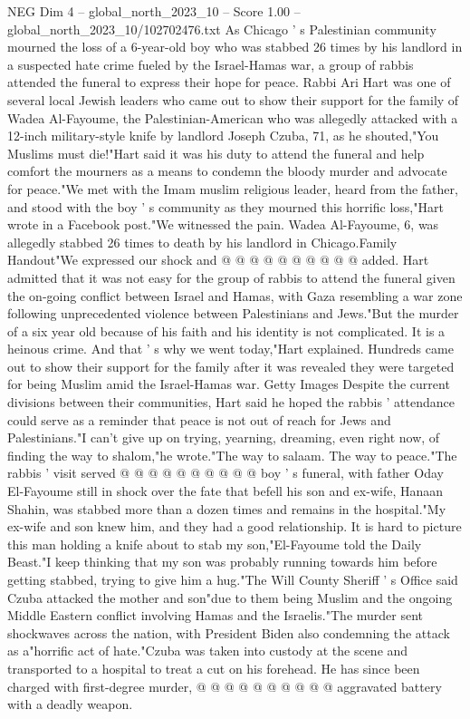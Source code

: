 \begin{textsample}{NEG Dim 4 – global\_north\_2023\_10 – Score 1.00 – global\_north\_2023\_10/102702476.txt}  \label{ex:f4_neg_017}
As Chicago ' s Palestinian community mourned the loss of a 6-year-old boy who was stabbed 26 times by his landlord in a suspected hate crime fueled by the Israel-Hamas war, a group of rabbis attended the funeral to express their hope for peace.
Rabbi Ari Hart was one of several local Jewish leaders who came out to show their support for the family of Wadea Al-Fayoume, the Palestinian-American who was allegedly attacked with a 12-inch military-style knife by landlord Joseph Czuba, 71, as he shouted,"You Muslims must die!"Hart said it was his duty to attend the funeral and help comfort the mourners as a means to condemn the bloody murder and advocate for peace."We met with the Imam muslim religious leader, heard from the father, and stood with the boy ' s community as they mourned this horrific loss,"Hart wrote in a Facebook post."We witnessed the pain.
Wadea Al-Fayoume, 6, was allegedly stabbed 26 times to death by his landlord in Chicago.Family Handout"We expressed our shock and @ @ @ @ @ @ @ @ @ @ added.
Hart admitted that it was not easy for the group of rabbis to attend the funeral given the on-going conflict between Israel and Hamas, with Gaza resembling a war zone following unprecedented violence between Palestinians and Jews."But the murder of a six year old because of his faith and his identity is not complicated.
It is a heinous crime.
And that ' s why we went today,"Hart explained.
Hundreds came out to show their support for the family after it was revealed they were targeted for being Muslim amid the Israel-Hamas war.
Getty Images Despite the current divisions between their communities, Hart said he hoped the rabbis ' attendance could serve as a reminder that peace is not out of reach for Jews and Palestinians."I can't give up on trying, yearning, dreaming, even right now, of finding the way to shalom,"he wrote."The way to salaam.
The way to peace."The rabbis ' visit served @ @ @ @ @ @ @ @ @ @ boy ' s funeral, with father Oday El-Fayoume still in shock over the fate that befell his son and ex-wife, Hanaan Shahin, was stabbed more than a dozen times and remains in the hospital."My ex-wife and son knew him, and they had a good relationship.
It is hard to picture this man holding a knife about to stab my son,"El-Fayoume told the Daily Beast."I keep thinking that my son was probably running towards him before getting stabbed, trying to give him a hug."The Will County Sheriff ' s Office said Czuba attacked the mother and son"due to them being Muslim and the ongoing Middle Eastern conflict involving Hamas and the Israelis."The murder sent shockwaves across the nation, with President Biden also condemning the attack as a"horrific act of hate."Czuba was taken into custody at the scene and transported to a hospital to treat a cut on his forehead.
He has since been charged with first-degree murder, @ @ @ @ @ @ @ @ @ @ aggravated battery with a deadly weapon.

\end{textsample}
